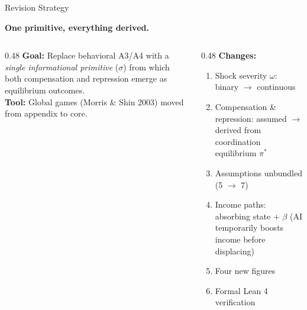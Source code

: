 \documentclass[
  ignorenonframetext,
  aspectratio=169]{beamer}
\begin{document}
\begin{frame}{Revision Strategy}
\protect{}\label{revision-strategy}
\begin{center}
\large\textbf{One primitive, everything derived.}
\end{center}

\vspace{0.4cm}

\begin{columns}[T]
\begin{column}{0.48\textwidth}
\textbf{Goal:} Replace behavioral A3/A4 with a \emph{single informational primitive} ($\sigma$) from which both compensation and repression emerge as equilibrium outcomes.\\[6pt]
\textbf{Tool:} Global games (Morris \& Shin 2003) moved from appendix to core.
\end{column}
\begin{column}{0.48\textwidth}
\textbf{Changes:}
\begin{enumerate}
  \item Shock severity $\omega$: binary $\to$ continuous
  \item Compensation \& repression: assumed $\to$ derived from coordination equilibrium $\pi^*$
  \item Assumptions unbundled (5 $\to$ 7)
  \item Income paths: absorbing state + $\beta$ (AI temporarily boosts income before displacing)
  \item Four new figures
  \item Formal Lean 4 verification
\end{enumerate}
\end{column}
\end{columns}
\end{frame}
\end{document}
